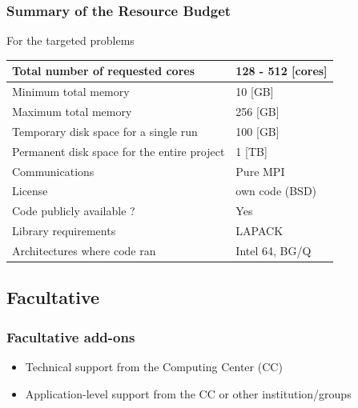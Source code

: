 \begin{frame}[containsverbatim]
	\frametitle{Summary of the Resource Budget}
For the targeted problems
\begin{center}
\begin{tabular}{| l | l |}
	\hline
	Total number of requested cores & 128 - 512 [cores]\\
	\hline
	Minimum total memory & 10 [GB] \\
	\hline
	Maximum total memory & 256 [GB] \\
	\hline
	Temporary disk space for a single run & 100 [GB] \\
	\hline
	Permanent disk space for the entire project & 1 [TB] \\
	\hline
	Communications & Pure MPI \\
	\hline
	License & own code (BSD) \\
	\hline
	Code publicly available ? & Yes \\
	\hline
	Library requirements & LAPACK \\
	\hline
	Architectures where code ran & Intel 64, BG/Q  \\
	\hline
\end{tabular}
\end{center}
\end{frame}



\subsection{Facultative}


\begin{frame}[containsverbatim]
	\frametitle{Facultative add-ons}

\begin{itemize}
	\item { Technical support from the Computing Center (CC)}
	\item { Application-level support from the CC or other institution/groups}
\end{itemize}
\end{frame}






